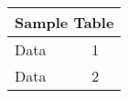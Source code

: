   \begin{table}
    \centering
    \begin{tabular}{|l|l|}
      \hline
      \multicolumn{2}{|c|}{Sample Table} \\
      \hline
      Data & 1 \\
      Data & 2 \\
      \hline
    \end{tabular}
  \end{table}
